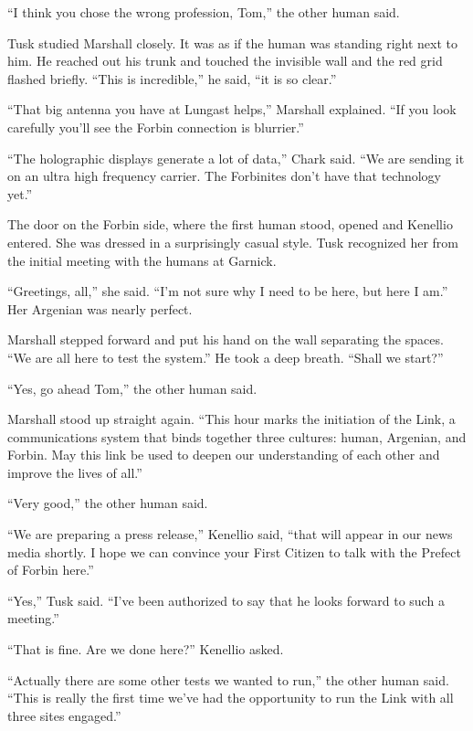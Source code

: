 ``I think you chose the wrong profession, Tom,'' the other human said.

Tusk studied Marshall closely. It was as if the human was standing right next to him. He reached
out his trunk and touched the invisible wall and the red grid flashed briefly. ``This is
incredible,'' he said, ``it is so clear.''

``That big antenna you have at Lungast helps,'' Marshall explained. ``If you look carefully
you'll see the Forbin connection is blurrier.''

``The holographic displays generate a lot of data,'' Chark said. ``We are sending it on an ultra
high frequency carrier. The Forbinites don't have that technology yet.''


The door on the Forbin side, where the first human stood, opened and Kenellio entered. She was
dressed in a surprisingly casual style. Tusk recognized her from the initial meeting with the
humans at Garnick.

``Greetings, all,'' she said. ``I'm not sure why I need to be here, but here I am.'' Her
Argenian was nearly perfect.

Marshall stepped forward and put his hand on the wall separating the spaces. ``We are all here
to test the system.'' He took a deep breath. ``Shall we start?''

``Yes, go ahead Tom,'' the other human said.

Marshall stood up straight again. ``This hour marks the initiation of the Link, a communications
system that binds together three cultures: human, Argenian, and Forbin. May this link be used to
deepen our understanding of each other and improve the lives of all.''

``Very good,'' the other human said.

``We are preparing a press release,'' Kenellio said, ``that will appear in our news media
shortly. I hope we can convince your First Citizen to talk with the Prefect of Forbin here.''

``Yes,'' Tusk said. ``I've been authorized to say that he looks forward to such a meeting.''

``That is fine. Are we done here?'' Kenellio asked.

``Actually there are some other tests we wanted to run,'' the other human said. ``This is really
the first time we've had the opportunity to run the Link with all three sites engaged.''

